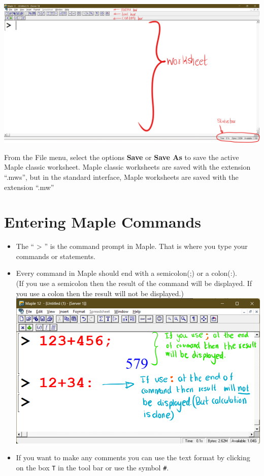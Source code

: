 \documentclass[
]{book}
\providecommand{\tightlist}{%
  \setlength{\itemsep}{0pt}\setlength{\parskip}{0pt}}
\theoremstyle{definition}
\theoremstyle{definition}
\theoremstyle{definition}
\theoremstyle{definition}
\theoremstyle{remark}
\begin{document}
\includegraphics{figures/Lesson 1/fig2.png}

From the File menu, select the options \textbf{Save} or \textbf{Save As} to save the active Maple classic worksheet.
Maple classic worksheets are saved with the extension ``.mws'', but in the standard interface, Maple worksheets are saved with the extension ``.mw''

\section{Entering Maple Commands}\label{entering-maple-commands-1}

\begin{itemize}
\tightlist
\item
  The `` \textgreater{} '' is the command prompt in Maple. That is where you type your commands or statements.
\item
  Every command in Maple should end with a semicolon(;) or a colon(:).\\
  (If you use a semicolon then the result of the command will be displayed. If you use a colon then the result will not be displayed.)
  \includegraphics{figures/Lesson 1/fig3.png}
\item
  If you want to make any comments you can use the text format by clicking on the box \texttt{T} in the tool bar or use the symbol \texttt{\#}.
\end{itemize}
\end{document}
